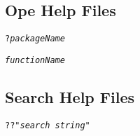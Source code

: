 \documentclass{tufte-handout}
\begin{document}
\subsection{Ope Help Files}
{\color{red}\texttt{?}}\texttt{\textit{packageName}}
\par {}\texttt{\textit{functionName}}

\vspace{3mm}
\subsection{Search Help Files}
{\color{red}\texttt{??}}\texttt{"\textit{search string}"}

\end{document}
